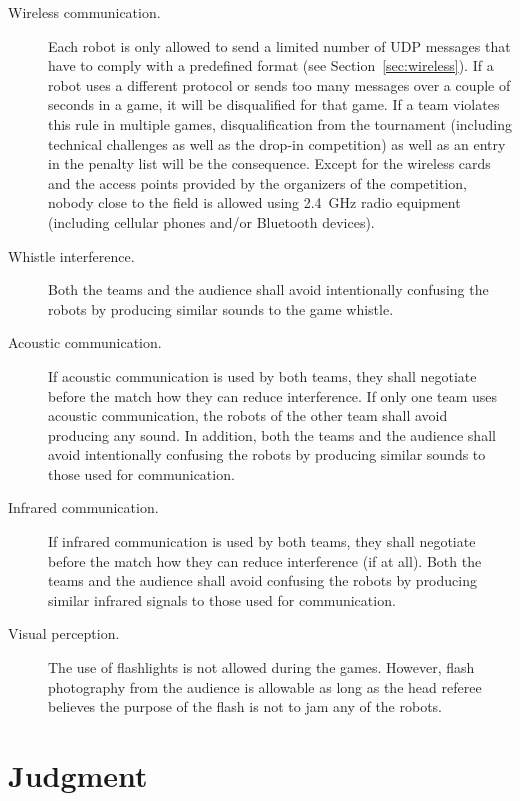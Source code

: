 \documentclass[12pt]{article}
\newcommand{\cf}{see\xspace}
\begin{document}
\begin{description}

\item[Wireless communication.] Each robot is only allowed to send a limited number of UDP messages that have to comply with a predefined format (\cf Section~\ref{sec:wireless}). If a robot uses a different protocol or sends too many messages over a couple of seconds in a game, it will be disqualified for that game. If a team violates this rule in multiple games, disqualification from the tournament (including technical challenges as well as the drop-in competition) as well as an entry in the penalty list will be the consequence. Except for the wireless cards and the access points provided by the organizers of the competition, nobody close to the field is allowed using 2.4~GHz radio equipment (including cellular phones and/or Bluetooth devices).

\item[Whistle interference.] Both the teams and the audience shall avoid intentionally confusing the robots by producing similar sounds to the game whistle.

\item[Acoustic communication.] If acoustic communication is used by both teams, they shall negotiate before the match how they can reduce interference. If only one team uses acoustic communication, the robots of the other team shall avoid producing any sound. In addition, both the teams and the audience shall avoid intentionally confusing the robots by producing similar sounds to those used for communication.

\item[Infrared communication.] If infrared communication is used by both teams, they shall negotiate before the match how they can reduce interference (if at all). Both the teams and the audience shall avoid confusing the robots by producing similar infrared signals to those used for communication.

\item[Visual perception.] The use of flashlights is not allowed during the games.  However, flash photography from the audience is allowable as long as the head referee believes the purpose of the flash is not to jam any of the robots.

\end{description}


\newpage


\section{Judgment}
\end{document}
